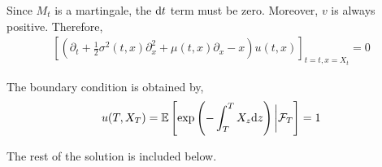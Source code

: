 \documentclass[10pt]{article}
\begin{document}
\begin{solution}
    Since \( M_t \) is a martingale, the \( \mathrm{d} t \) term must be zero. Moreover, \( v \) is always positive. Therefore,
    \begin{align*}
        \left[ \left( \partial_t + \frac{1}{2}\sigma^2(t,x) \partial_x^2 + \mu(t,x) \partial_x - x \right)u(t,x) \right]_{t=t,x=X_t} = 0
    \end{align*}
    
    The boundary condition is obtained by,
    \begin{align*}
        u(T,X_T) = \mathbb{E} \left[ \exp \left( -\int_T^T X_z\mathrm{d} z \right) \bigg| \mathcal{F}_T \right] = 1
    \end{align*}
    
    The rest of the solution is included below.
\end{solution}
\end{document}
